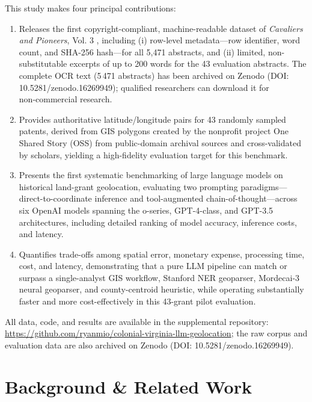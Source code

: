 This study makes four principal contributions:

\begin{enumerate}
\def\labelenumi{\arabic{enumi}.}
\tightlist
\item
  Releases the first copyright-compliant, machine-readable dataset of
  \emph{Cavaliers and Pioneers}, Vol. 3 \citep{Nugent1979_cavaliers3},
  including (i) row-level metadata---row identifier, word count, and
  SHA-256 hash---for all 5,471 abstracts, and (ii) limited,
  non-substitutable excerpts of up to 200 words for the 43 evaluation
  abstracts. The complete OCR text (5\,471 abstracts) has been archived
  on Zenodo (DOI: 10.5281/zenodo.16269949); qualified researchers can
  download it for non‑commercial research.
\item
  Provides authoritative latitude/longitude pairs for 43 randomly
  sampled patents, derived from GIS polygons created by the nonprofit
  project One Shared Story (OSS) from public-domain archival sources and
  cross-validated by scholars, yielding a high-fidelity evaluation
  target for this benchmark.
\item
  Presents the first systematic benchmarking of large language models on
  historical land-grant geolocation, evaluating two prompting
  paradigms---direct-to-coordinate inference and tool-augmented
  chain-of-thought---across six OpenAI models spanning the o-series,
  GPT-4-class, and GPT-3.5 architectures, including detailed ranking of
  model accuracy, inference costs, and latency.
\item
  Quantifies trade-offs among spatial error, monetary expense,
  processing time, cost, and latency, demonstrating that a pure LLM
  pipeline can match or surpass a single-analyst GIS workflow, Stanford
  NER geoparser, Mordecai-3 neural geoparser, and county-centroid
  heuristic, while operating substantially faster and more
  cost-effectively in this 43-grant pilot evaluation.
\end{enumerate}

All data, code, and results are available in the supplemental
repository:
\url{https://github.com/ryanmio/colonial-virginia-llm-geolocation}; the
raw corpus and evaluation data are also archived on Zenodo (DOI:
10.5281/zenodo.16269949).

\section{Background \& Related Work}\label{background-related-work}

